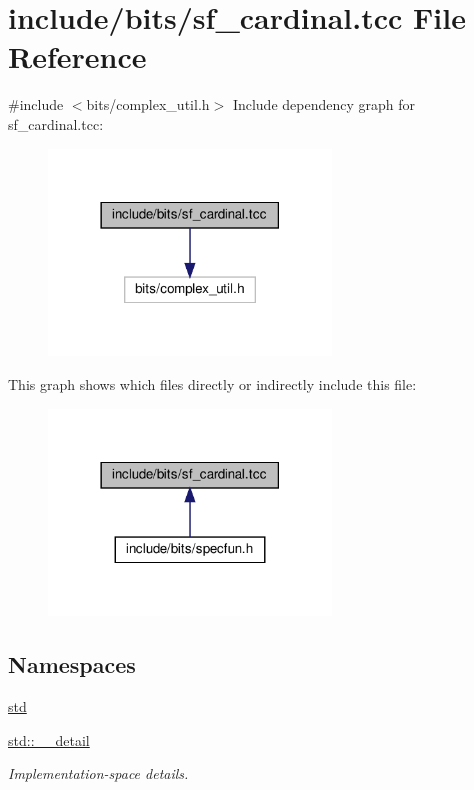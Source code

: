 \hypertarget{sf__cardinal_8tcc}{}\section{include/bits/sf\+\_\+cardinal.tcc File Reference}
\label{sf__cardinal_8tcc}
{\ttfamily \#include $<$bits/complex\+\_\+util.\+h$>$}\newline
Include dependency graph for sf\+\_\+cardinal.\+tcc\+:
\nopagebreak
\begin{figure}[H]
\begin{center}
\leavevmode
\includegraphics[width=213pt]{sf__cardinal_8tcc__incl}
\end{center}
\end{figure}
This graph shows which files directly or indirectly include this file\+:
\nopagebreak
\begin{figure}[H]
\begin{center}
\leavevmode
\includegraphics[width=213pt]{sf__cardinal_8tcc__dep__incl}
\end{center}
\end{figure}
\subsection*{Namespaces}
\begin{DoxyCompactItemize}
\item 
 \hyperlink{namespacestd}{std}
\item 
 \hyperlink{namespacestd_1_1____detail}{std\+::\+\_\+\+\_\+detail}
\begin{DoxyCompactList}\small\item\em Implementation-\/space details. \end{DoxyCompactList}\end{DoxyCompactItemize}
